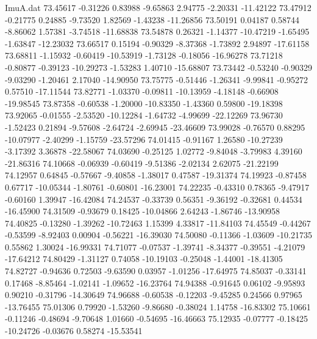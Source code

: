 \begin{filecontents}{ImuA.dat}
  73.45617   -0.31226    0.83988   -9.65863    2.94775   -2.20331  -11.42122
  73.47912   -0.21775    0.24885   -9.73520    1.82569   -1.43238  -11.26856
  73.50191    0.04187    0.58744   -8.86062    1.57381   -3.74518  -11.68838
  73.54878    0.26321   -1.14377  -10.47219   -1.65495   -1.63847  -12.23032
  73.66517    0.15194   -0.90329   -8.37368   -1.73892    2.94897  -17.61158
  73.68811   -1.15932   -0.60419  -10.53919   -1.73128   -0.18056  -16.96278
  73.71218   -0.80877   -0.39123  -10.29273   -1.53283    1.40710  -15.68807
  73.73442   -0.53240   -0.90329   -9.03290   -1.20461    2.17040  -14.90950
  73.75775   -0.51446   -1.26341   -9.99841   -0.95272    0.57510  -17.11544
  73.82771   -1.03370   -0.09811  -10.13959   -4.18148   -0.66908  -19.98545
  73.87358   -0.60538   -1.20000  -10.83350   -1.43360    0.59800  -19.18398
  73.92065   -0.01555   -2.53520  -10.12284   -1.64732   -4.99699  -22.12269
  73.96730   -1.52423    0.21894   -9.57608   -2.64724   -2.69945  -23.46609
  73.99028   -0.76570    0.88295  -10.07977   -2.40299   -1.15759  -23.57296
  74.01415   -0.91167    1.26580  -10.27239   -3.17392    3.36878  -22.58067
  74.03690   -0.25125    1.02772   -9.84048   -3.79983    4.39160  -21.86316
  74.10668   -0.06939   -0.60419   -9.51386   -2.02134    2.62075  -21.22199
  74.12957    0.64845   -0.57667   -9.40858   -1.38017    0.47587  -19.31374
  74.19923   -0.87458    0.67717  -10.05344   -1.80761   -0.60801  -16.23001
  74.22235   -0.43310    0.78365   -9.47917   -0.60160    1.39947  -16.42084
  74.24537   -0.33739    0.56351   -9.36192   -0.32681    0.44534  -16.45900
  74.31509   -0.93679    0.18425  -10.04866    2.64243   -1.86746  -13.90958
  74.40825   -0.13280   -1.39262  -10.72463    1.15399    4.33817  -11.84103
  74.45549   -0.44267   -0.53599   -8.92403    0.00904   -0.56221  -16.39030
  74.50080   -0.11366   -1.03609  -10.21735    0.55862    1.30024  -16.99331
  74.71077   -0.07537   -1.39741   -8.34377   -0.39551   -4.21079  -17.64212
  74.80429   -1.31127    0.74058  -10.19103   -0.25048   -1.44001  -18.41305
  74.82727   -0.94636    0.72503   -9.63590    0.03957   -1.01256  -17.64975
  74.85037   -0.33141    0.17468   -8.85464   -1.02141   -1.09652  -16.23764
  74.94388   -0.91645    0.06102   -9.95893    0.90210   -0.31796  -14.30649
  74.96688   -0.60538   -0.12203   -9.45285    0.24566    0.97965  -13.76455
  75.01306    0.79920   -1.53260   -9.86680   -0.38024    1.14758  -16.83302
  75.10661   -0.11246   -0.48694   -9.70648    1.01660   -0.54695  -16.46663
  75.12935   -0.07777   -0.18425  -10.24726   -0.03676    0.58274  -15.53541

\end{filecontents}
